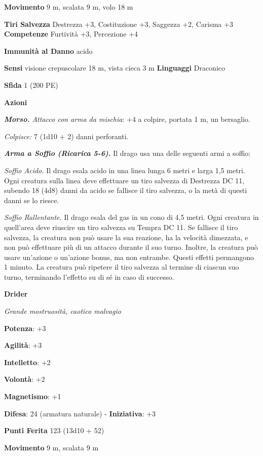 \begin{multicols}{2}
\textbf{Movimento} 9 m, scalata 9 m, volo 18 m

\textbf{Tiri Salvezza} Destrezza +3, Costituzione +3, Saggezza +2,
Carisma +3 \textbf{Competenze} Furtività +3, Percezione +4

\textbf{Immunità al Danno} acido

\textbf{Sensi} visione crepuscolare 18 m, vista cieca 3 m
\textbf{Linguaggi} Draconico

\textbf{Sfida} 1 (200 PE)\smallskip

\smallskip\textbf{Azioni}

\emph{\textbf{Morso.} Attacco con arma da mischia}: +4 a colpire,
portata 1 m, un bersaglio.

\emph{Colpisce:} 7 (1d10 + 2) danni perforanti.

\emph{\textbf{Arma a Soffio (Ricarica 5-6).}} Il drago usa una delle
seguenti armi a soffio:

\emph{Soffio Acido.} Il drago esala acido in una linea lunga 6 metri e
larga 1,5 metri. Ogni creatura sulla linea deve effettuare un tiro
salvezza di Destrezza DC 11, subendo 18 (4d8) danni da acido se fallisce
il tiro salvezza, o la metà di questi danni se lo riesce.

\emph{Soffio Rallentante.} Il drago esala del gas in un cono di 4,5
metri. Ogni creatura in quell'area deve riuscire un tiro salvezza su Tempra DC 11. Se fallisce il tiro salvezza, la creatura non può
usare la sua reazione, ha la velocità dimezzata, e non può effettuare
più di un attacco durante il suo turno. Inoltre, la creatura può usare
un'azione o un'azione bonus, ma non entrambe. Questi effetti permangono
1 minuto. La creatura può ripetere il tiro salvezza al termine di
ciascun suo turno, terminando l'effetto su di sé in caso di successo.



\textbf{Drider}

\emph{Grande mostruosità, caotico malvagio}

\textbf{Potenza}: +3

\textbf{Agilità}: +3

\textbf{Intelletto}: +2

\textbf{Volontà}: +2

\textbf{Magnetismo}: +1

\textbf{Difesa}: 24 (armatura naturale) - \textbf{Iniziativa}: +3

\textbf{Punti Ferita} 123 (13d10 + 52)

\textbf{Movimento} 9 m, scalata 9 m


\end{multicols}
